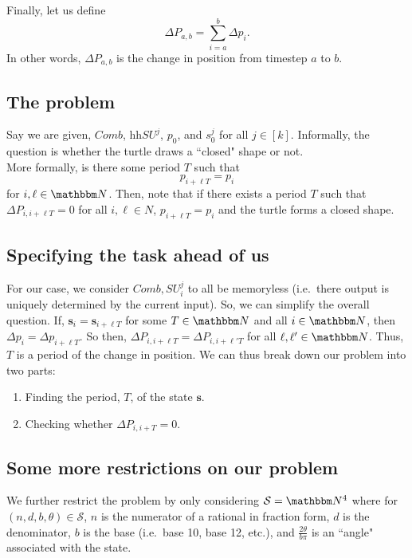 \documentclass[11pt,titlepage]{article}
\begin{document}
Finally, let us define
$$
  \Delta P_{a, b} = \sum_{i = a}^{b} \Delta p_i.
$$
In other words, $\Delta P_{a, b}$ is the change in position from timestep $a$ to $b$.

\subsection{The problem}
Say we are given, $Comb$, hh$SU^j$, $p_0$, and $s^j_0$ for all $j \in [k]$.
Informally, the question is whether the turtle draws a ``closed" shape or not.\\
More formally, is there some period $T$ such that 
$$
  p_{i + \ell T} = p_{i}
$$
for $i, \ell \in \N$.
Then, note that if there exists a period $T$ such that 
$\Delta P_{i, i + \ell T} = 0$ for all $i, \ell \in N$, 
$p_{i + \ell T} = p_{i}$ and the turtle forms a closed shape.


\subsection{Specifying the task ahead of us}
For our case, we consider $Comb, SU_i^j$ to all be memoryless (i.e.\ there output
is uniquely determined by the current input). So, we can simplify the overall question.
If, $\pmb{s}_i = \pmb{s}_{i + \ell T}$ for some $T \in \N$ and all $i \in \N$, then 
$\Delta p_{i} = \Delta p_{i + \ell T}$. So then,
$\Delta P_{i, i + \ell T} = \Delta P_{i, i + \ell' T}$ for all $\ell, \ell' \in \N$.
Thus, $T$ is a period of the change in position. We can thus
break down our problem into two parts:
\begin{enumerate}
  \item Finding the period, $T$, of the state $\pmb{s}$.
  \item Checking whether $\Delta P_{i, i + T} = 0$.
\end{enumerate}

\subsection{Some more restrictions on our problem}
We further restrict the problem by only considering $\mathcal{S} = \N^4$ where for $(n, d, b, \theta) \in \mathcal{S}$,
$n$ is the numerator of a rational in fraction form, $d$ is the denominator, 
$b$ is the base (i.e.\ base 10, base 12, etc.),
and $\frac{2\theta}{b \pi}$ is an ``angle" associated with the state.
\end{document}
